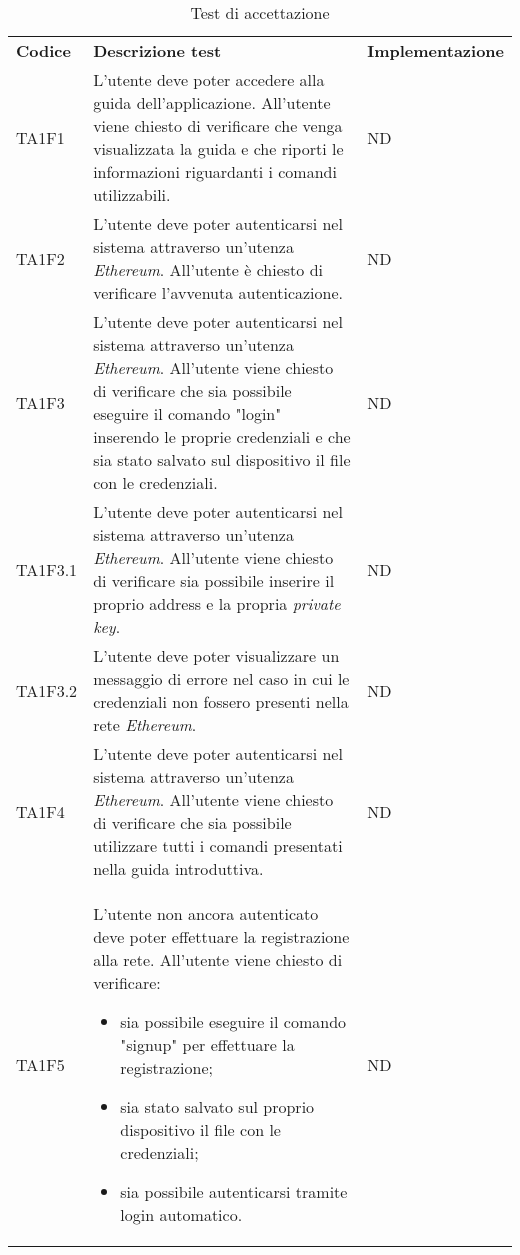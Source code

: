 \setlength{\tabcolsep}{0.5em}
\renewcommand{\arraystretch}{1.5}
\begin{longtable}{|C{1.5cm}|C{9cm}|C{3cm}|}

	\caption{Test di accettazione }\\
	\hline

	\textbf{Codice} & \textbf{Descrizione test}  & \textbf{Implementazione}
	\tabularnewline
	\endfirsthead

	TA1F1 &
	L’utente deve poter accedere alla guida dell’applicazione. All’utente viene chiesto di veriﬁcare che venga visualizzata la guida e che riporti le informazioni riguardanti i comandi utilizzabili.  &
	ND \\

	TA1F2  &
	L’utente deve poter autenticarsi nel sistema attraverso un'utenza \textit{Ethereum\glos}.
	All’utente è chiesto di veriﬁcare l’avvenuta autenticazione. &
	ND \\

	TA1F3 &
	L’utente deve poter autenticarsi nel sistema attraverso un'utenza \textit{Ethereum\glos}. All’utente viene chiesto di verificare che sia possibile eseguire il comando "login" inserendo le proprie credenziali e che sia stato salvato sul dispositivo il file con le credenziali. &
	ND \\

	TA1F3.1 &
	L’utente deve poter autenticarsi nel sistema attraverso un'utenza \textit{Ethereum\glos}. All’utente viene chiesto di verificare sia possibile inserire il proprio address e la propria \textit{private key\glos}. &
	ND \\

	TA1F3.2 &
	L’utente deve poter visualizzare un messaggio di errore nel caso in cui le credenziali non fossero	presenti nella rete \textit{Ethereum\glo}. &
	ND \\

	TA1F4 &
	L’utente deve poter autenticarsi nel sistema attraverso un'utenza \textit{Ethereum}. All’utente viene chiesto di verificare che sia possibile utilizzare tutti i comandi presentati nella guida introduttiva. &
	ND \\

	TA1F5 &
	L’utente non ancora autenticato deve poter effettuare la registrazione alla rete. All’utente viene chiesto di verificare:
	\begin{itemize}
		\item sia possibile eseguire il comando "signup" per effettuare la registrazione;
		\item sia stato salvato sul proprio dispositivo il file con le credenziali;
		\item sia possibile autenticarsi tramite login automatico.
	\end{itemize} &
	ND \\ [-5ex]


\end{longtable}

